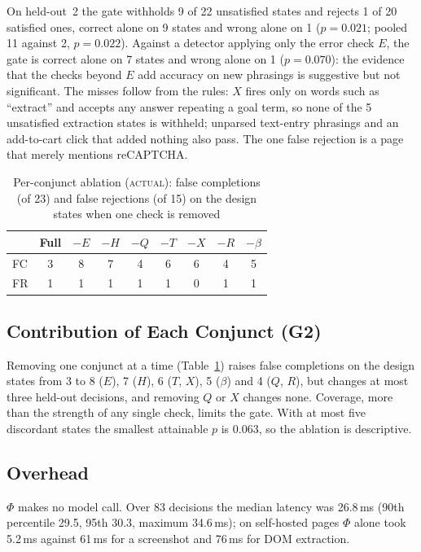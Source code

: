 \documentclass[conference]{IEEEtran}
\newcommand{\status}[1]{\textsc{#1}}
\begin{document}
On held-out~2 the gate withholds 9 of 22 unsatisfied states and rejects 1 of 20 satisfied ones, correct alone on 9 states and wrong alone on 1 ($p=0.021$; pooled 11 against 2, $p=0.022$). Against a detector applying only the error check $E$, the gate is correct alone on 7 states and wrong alone on 1 ($p=0.070$): the evidence that the checks beyond $E$ add accuracy on new phrasings is suggestive but not significant. The misses follow from the rules: $X$ fires only on words such as ``extract'' and accepts any answer repeating a goal term, so none of the 5 unsatisfied extraction states is withheld; unparsed text-entry phrasings and an add-to-cart click that added nothing also pass. The one false rejection is a page that merely mentions reCAPTCHA.

\begin{table}[t]
\centering
\caption{Per-conjunct ablation (\status{actual}): false completions (of 23) and false rejections (of 15) on the design states when one check is removed}
\label{tab:abl}
\footnotesize
\setlength{\tabcolsep}{3.2pt}
\begin{tabular}{@{}lcccccccc@{}}
\toprule
 & Full & $-E$ & $-H$ & $-Q$ & $-T$ & $-X$ & $-R$ & $-\beta$\\
\midrule
FC & 3 & 8 & 7 & 4 & 6 & 6 & 4 & 5\\
FR & 1 & 1 & 1 & 1 & 1 & 0 & 1 & 1\\
\bottomrule
\end{tabular}
\end{table}

\subsection{Contribution of Each Conjunct (G2)}
Removing one conjunct at a time (Table~\ref{tab:abl}) raises false completions on the design states from 3 to 8 ($E$), 7 ($H$), 6 ($T$, $X$), 5 ($\beta$) and 4 ($Q$, $R$), but changes at most three held-out decisions, and removing $Q$ or $X$ changes none. Coverage, more than the strength of any single check, limits the gate. With at most five discordant states the smallest attainable $p$ is 0.063, so the ablation is descriptive.

\subsection{Overhead}
$\Phi$ makes no model call. Over 83 decisions the median latency was 26.8\,ms (90th percentile 29.5, 95th 30.3, maximum 34.6\,ms); on self-hosted pages $\Phi$ alone took 5.2\,ms against 61\,ms for a screenshot and 76\,ms for DOM extraction.
\end{document}
